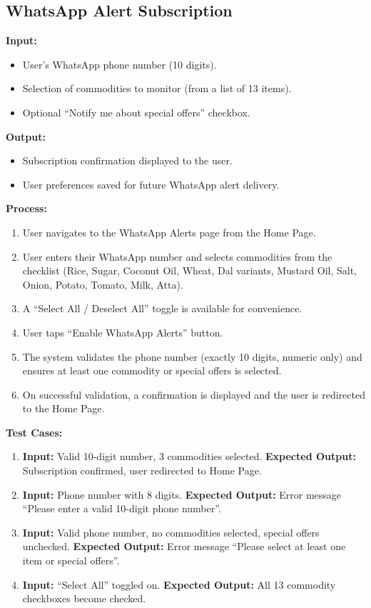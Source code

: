 \subsection{WhatsApp Alert Subscription}

\textbf{Input:}
\begin{itemize}
    \item User's WhatsApp phone number (10 digits).
    \item Selection of commodities to monitor (from a list of 13 items).
    \item Optional ``Notify me about special offers'' checkbox.
\end{itemize}

\textbf{Output:}
\begin{itemize}
    \item Subscription confirmation displayed to the user.
    \item User preferences saved for future WhatsApp alert delivery.
\end{itemize}

\textbf{Process:}
\begin{enumerate}
    \item User navigates to the WhatsApp Alerts page from the Home Page.
    \item User enters their WhatsApp number and selects commodities from the checklist (Rice, Sugar, Coconut Oil, Wheat, Dal variants, Mustard Oil, Salt, Onion, Potato, Tomato, Milk, Atta).
    \item A ``Select All / Deselect All'' toggle is available for convenience.
    \item User taps ``Enable WhatsApp Alerts'' button.
    \item The system validates the phone number (exactly 10 digits, numeric only) and ensures at least one commodity or special offers is selected.
    \item On successful validation, a confirmation is displayed and the user is redirected to the Home Page.
\end{enumerate}

\textbf{Test Cases:}
\begin{enumerate}
    \item \textbf{Input:} Valid 10-digit number, 3 commodities selected. \textbf{Expected Output:} Subscription confirmed, user redirected to Home Page.

    \item \textbf{Input:} Phone number with 8 digits. \textbf{Expected Output:} Error message ``Please enter a valid 10-digit phone number''.

    \item \textbf{Input:} Valid phone number, no commodities selected, special offers unchecked. \textbf{Expected Output:} Error message ``Please select at least one item or special offers''.

    \item \textbf{Input:} ``Select All'' toggled on. \textbf{Expected Output:} All 13 commodity checkboxes become checked.
\end{enumerate}

